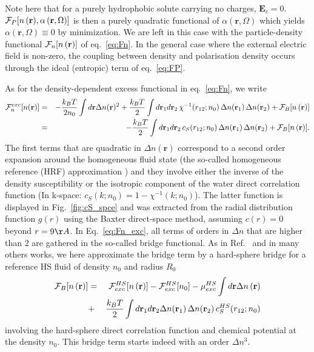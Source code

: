 \documentclass[aip,jcp,preprint]{revtex4-1}
\newcommand{\bea}{\begin{eqnarray}}
\newcommand{\eea}{\end{eqnarray}}
\newcommand{\nn}{\nonumber}
\newcommand{\rr}{\mathbf{r}}
\newcommand{\rhon}{{n\left({\mathbf r}\right)}}
\newcommand{\alpharom}{{\alpha\left({\mathbf r},\Omega\right)}}
\newcommand{\F}{{\cal F}}
\newcommand{\EE}{\mathbf{E}}
\begin{document}
Note here that for a purely hydrophobic solute carrying no charges, $\EE_c = 0$. 
$\F_P[\rhon,\alpharom]$ is then a purely quadratic functional of $\alpharom$ which yields $\alpharom \equiv 0$ by minimization. 
We are left in this case  with the particle-density functional $\F_n[\rhon]$ of eq.~\ref{eq:Fn}.  In the general case where the external electric field is non-zero, the coupling between density and polarisation density occurs through the ideal (entropic) term of eq.~\ref{eq:FP}.

As for the density-dependent excess functional in eq.~\ref{eq:Fn},  we write
\bea
\F_n^{exc}[n(\rr)] &=&  -\frac{k_BT}{2n_0}  \int d\rr \Delta n(\rr)^2 + \frac{k_BT}{2}  \int d\rr_1 d\rr_2 \, \chi^{-1}(r_{12};n_0) \, \Delta n(\rr_1) \,  \Delta n(\rr_2)  + \F_B[\rhon] \nn \\
&=& - \frac{k_BT}{2} \int d\rr_1 d\rr_2 \, c_S(r_{12};n_0) \, \Delta n(\rr_1) \,  \Delta n(\rr_2)  + \F_B[\rhon].
\label{eq:Fn_exc} 
\eea
The first terms that are quadratic in $\Delta n(\rr)$ correspond  to a second order expansion around the homogeneous fluid state (the so-called homogeneous reference (HRF) approximation \cite{ramirez02}) and they involve either the  inverse of the density susceptibility or the isotropic component of the water direct correlation function (In k-space: $c_S(k;n_0) = 1 - \chi^{-1}(k;n_0)$). The latter function is displayed in Fig.~\ref{fig:cS_spce} and was extracted from the radial distribution function $g(r)$  using the Baxter direct-space method, assuming $c(r)=0$ beyond $r = 9 \AA$\cite{ramirez05-CP}. 
In Eq.~\ref{eq:Fn_exc}, all   terms of  orders in $\Delta n$ that are higher than 2 are gathered in the  so-called bridge functional. As in Ref.~ and  in many others works\cite{rosenfeld93,zhao-wu11,zhao-wu11-correction,liu13}, we here approximate the bridge term by a hard-sphere bridge for a reference HS fluid of density $n_0$ and radius $R_0$
\bea
\F_B[\rhon] &= &\F_{exc}^{HS}[\rhon] -   \F_{exc}^{HS}[n_0] - \mu_{exc}^{HS} \int d\rr \Delta\rhon \nn \\
& +  & \frac{k_BT}{2} \int d\rr_1d\rr_2 \Delta n(\rr_1) \, \Delta n(\rr_2) \, c_S^{HS}(r_{12};n_0)  
\label{eq:Fn_bridge}
\eea
involving the hard-sphere direct correlation function  and chemical potential  at the density $n_0$. 
This bridge term starts indeed with an  order $\Delta n^3$.
\end{document}
